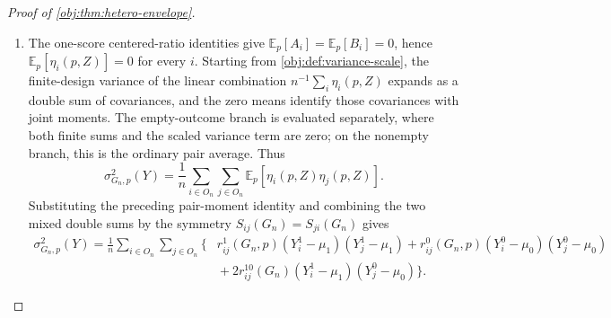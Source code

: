 \documentclass[11pt]{article}
\begin{document}
\begin{proof}[Proof of \cref{obj:thm:hetero-envelope}]
\begin{enumerate}
\[\]
For the mixed moment, if \(S_{ij}(G_n)\neq\varnothing\), then a shared intervention is required to be both treated and untreated in \(T_i(Z)C_j(Z)\), so \(T_i(Z)C_j(Z)=0\) for every assignment and
\(\mathbb E_p[A_iB_j]=-1\).  If \(S_{ij}(G_n)=\varnothing\), the two exposure events use disjoint assignment coordinates, so
\(\mathbb E_p[T_i(Z)C_j(Z)]=\pi_i^1(p)\pi_j^0(p)\) and \(\mathbb E_p[A_iB_j]=0\).  Thus
\[
\mathbb E_p[A_iB_j]=-r_{ij}^{10}(G_n).
\]
The same argument with \(i\) and \(j\) exchanged, using \(S_{ij}(G_n)=S_{ji}(G_n)\), gives
\[
\mathbb E_p[B_iA_j]=-r_{ij}^{10}(G_n).
\]
Expanding the product of the two linearization summands,
\[
\begin{aligned}
\eta_i(p,Z)\eta_j(p,Z)
={}&A_iA_j(Y_i^1-\mu_1)(Y_j^1-\mu_1)
-A_iB_j(Y_i^1-\mu_1)(Y_j^0-\mu_0)\\
&{}-B_iA_j(Y_i^0-\mu_0)(Y_j^1-\mu_1)
+B_iB_j(Y_i^0-\mu_0)(Y_j^0-\mu_0),
\end{aligned}
\]
and inserting the four moment identities yields
\[
\begin{aligned}
\mathbb E_p\!\left[\eta_i(p,Z)\eta_j(p,Z)\right]
={}&
r_{ij}^1(G_n,p)(Y_i^1-\mu_1)(Y_j^1-\mu_1)
+r_{ij}^0(G_n,p)(Y_i^0-\mu_0)(Y_j^0-\mu_0)\\
&{}+r_{ij}^{10}(G_n)\!
\left\{(Y_i^1-\mu_1)(Y_j^0-\mu_0)+(Y_i^0-\mu_0)(Y_j^1-\mu_1)\right\}.
\end{aligned}
\]

\item The one-score centered-ratio identities give \(\mathbb E_p[A_i]=\mathbb E_p[B_i]=0\), hence \(\mathbb E_p[\eta_i(p,Z)]=0\) for every \(i\).  Starting from \cref{obj:def:variance-scale}, the finite-design variance of the linear combination \(n^{-1}\sum_i\eta_i(p,Z)\) expands as a double sum of covariances, and the zero means identify those covariances with joint moments.  The empty-outcome branch is evaluated separately, where both finite sums and the scaled variance term are zero; on the nonempty branch, this is the ordinary pair average.  Thus
\[
\sigma^2_{G_n,p}(Y)
=\frac1n\sum_{i\in O_n}\sum_{j\in O_n}
\mathbb E_p\!\left[\eta_i(p,Z)\eta_j(p,Z)\right].
\]
Substituting the preceding pair-moment identity and combining the two mixed double sums by the symmetry \(S_{ij}(G_n)=S_{ji}(G_n)\) gives
\[
\begin{aligned}
\sigma^2_{G_n,p}(Y)
=
\frac1n\sum_{i\in O_n}\sum_{j\in O_n}
\bigl\{&
r_{ij}^1(G_n,p)(Y_i^1-\mu_1)(Y_j^1-\mu_1)
+r_{ij}^0(G_n,p)(Y_i^0-\mu_0)(Y_j^0-\mu_0)\\
&{}+2r_{ij}^{10}(G_n)(Y_i^1-\mu_1)(Y_j^0-\mu_0)
\bigr\}.
\end{aligned}
\]


\end{enumerate}
\end{proof}
\end{document}

